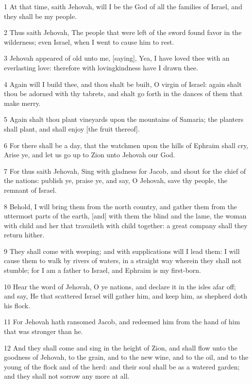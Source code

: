 \par 1 At that time, saith Jehovah, will I be the God of all the families of Israel, and they shall be my people.
\par 2 Thus saith Jehovah, The people that were left of the sword found favor in the wilderness; even Israel, when I went to cause him to rest.
\par 3 Jehovah appeared of old unto me, [saying], Yea, I have loved thee with an everlasting love: therefore with lovingkindness have I drawn thee.
\par 4 Again will I build thee, and thou shalt be built, O virgin of Israel: again shalt thou be adorned with thy tabrets, and shalt go forth in the dances of them that make merry.
\par 5 Again shalt thou plant vineyards upon the mountains of Samaria; the planters shall plant, and shall enjoy [the fruit thereof].
\par 6 For there shall be a day, that the watchmen upon the hills of Ephraim shall cry, Arise ye, and let us go up to Zion unto Jehovah our God.
\par 7 For thus saith Jehovah, Sing with gladness for Jacob, and shout for the chief of the nations: publish ye, praise ye, and say, O Jehovah, save thy people, the remnant of Israel.
\par 8 Behold, I will bring them from the north country, and gather them from the uttermost parts of the earth, [and] with them the blind and the lame, the woman with child and her that travaileth with child together: a great company shall they return hither.
\par 9 They shall come with weeping; and with supplications will I lead them: I will cause them to walk by rivers of waters, in a straight way wherein they shall not stumble; for I am a father to Israel, and Ephraim is my first-born.
\par 10 Hear the word of Jehovah, O ye nations, and declare it in the isles afar off; and say, He that scattered Israel will gather him, and keep him, as shepherd doth his flock.
\par 11 For Jehovah hath ransomed Jacob, and redeemed him from the hand of him that was stronger than he.
\par 12 And they shall come and sing in the height of Zion, and shall flow unto the goodness of Jehovah, to the grain, and to the new wine, and to the oil, and to the young of the flock and of the herd: and their soul shall be as a watered garden; and they shall not sorrow any more at all.
